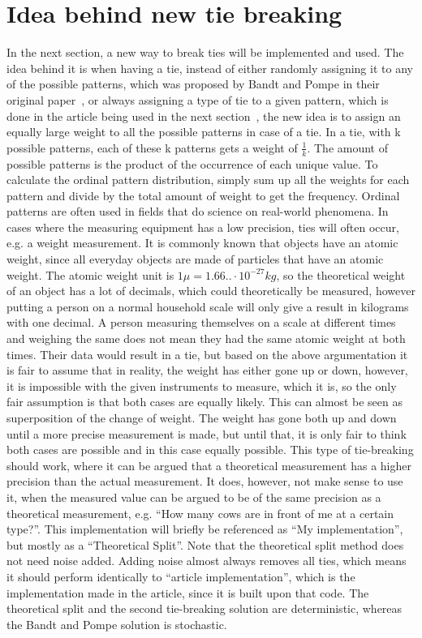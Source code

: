 \FloatBarrier

\section{Idea behind new tie breaking}
In the next section, a new way to break ties will be implemented and used. The idea behind it is when having a tie, instead of either randomly assigning it to any of the possible patterns, which was proposed by Bandt and Pompe in their original paper~\cite{Bandt2002}, or always assigning a type of tie to a given pattern, which is done in the article being used in the next section~\cite{Chagas2022}, the new idea is to assign an equally large weight to all the possible patterns in case of a tie. In a tie, with k possible patterns, each of these k patterns gets a weight of $\frac{1}{k}$. The amount of possible patterns is the product of the occurrence of each unique value. To calculate the ordinal pattern distribution, simply sum up all the weights for each pattern and divide by the total amount of weight to get the frequency. Ordinal patterns are often used in fields that do science on real-world phenomena. In cases where the measuring equipment has a low precision, ties will often occur, e.g. a weight measurement. It is commonly known that objects have an atomic weight, since all everyday objects are made of particles that have an atomic weight. The atomic weight unit is $1\mu = 1.66..\cdot10^{-27}kg$, so the theoretical weight of an object has a lot of decimals, which could theoretically be measured, however putting a person on a normal household scale will only give a result in kilograms with one decimal. A person measuring themselves on a scale at different times and weighing the same does not mean they had the same atomic weight at both times. Their data would result in a tie, but based on the above argumentation it is fair to assume that in reality, the weight has either gone up or down, however, it is impossible with the given instruments to measure, which it is, so the only fair assumption is that both cases are equally likely. This can almost be seen as superposition\cite{Schroedinger1926} of the change of weight. The weight has gone both up and down until a more precise measurement is made, but until that, it is only fair to think both cases are possible and in this case equally possible. This type of tie-breaking should work, where it can be argued that a theoretical measurement has a higher precision than the actual measurement. It does, however, not make sense to use it, when the measured value can be argued to be of the same precision as a theoretical measurement, e.g. “How many cows are in front of me at a certain type?”. This implementation will briefly be referenced as “My implementation”, but mostly as a “Theoretical Split”. Note that the theoretical split method does not need noise added. Adding noise almost always removes all ties, which means it should perform identically to “article implementation”, which is the implementation made in the article\cite{Chagas2022}, since it is built upon that code. The theoretical split and the second tie-breaking solution are deterministic, whereas the Bandt and Pompe solution is stochastic.

